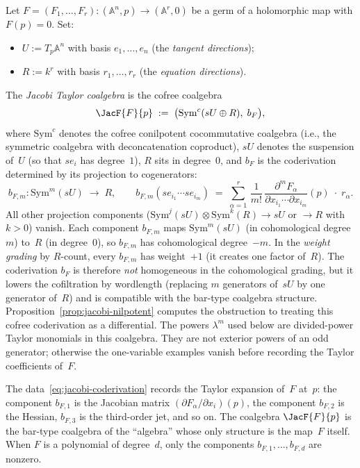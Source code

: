 \begin{construction}
\label{constr:jacobi-coalgebra}
Let $F = (F_1, \ldots, F_r) \colon (\mathbb{A}^n, p) \to (\mathbb{A}^r, 0)$ be a
germ of a holomorphic map with $F(p) = 0$. Set:
\begin{itemize}
\item $U := T_p\mathbb{A}^n$ with basis $e_1, \ldots, e_n$
 (the \emph{tangent directions});
\item $R := k^r$ with basis $r_1, \ldots, r_r$
 (the \emph{equation directions}).
\end{itemize}
The \emph{Jacobi Taylor coalgebra} is the cofree coalgebra
\[
\JacF{F}{p} \;:=\; \bigl(\mathrm{Sym}^c(sU \oplus R),\; b_F\bigr),
\]
where $\mathrm{Sym}^c$ denotes the cofree conilpotent cocommutative coalgebra
(i.e., the symmetric coalgebra with deconcatenation coproduct), $sU$
denotes the suspension of~$U$ (so that $se_i$ has degree~$1$), $R$
sits in degree~$0$, and $b_F$ is the coderivation determined by its
projection to cogenerators:
\begin{equation}\label{eq:jacobi-coderivation}
b_{F,m} \colon \mathrm{Sym}^m(sU) \;\longrightarrow\; R, \qquad
b_{F,m}(se_{i_1} \cdots se_{i_m})
\;=\; \sum_{\alpha=1}^{r}\,
\frac{1}{m!}\,
\frac{\partial^m F_\alpha}{\partial x_{i_1} \cdots \partial x_{i_m}}(p)
\;\cdot\; r_\alpha.
\end{equation}
All other projection components ($\mathrm{Sym}^j(sU) \otimes \mathrm{Sym}^k(R) \to sU$
or $\to R$ with $k > 0$) vanish. Each component $b_{F,m}$ maps
$\mathrm{Sym}^m(sU)$ (in cohomological degree~$m$) to~$R$ (in
degree~$0$), so $b_{F,m}$ has cohomological degree~$-m$. In the
\emph{weight grading} by $R$-count, every $b_{F,m}$ has weight~$+1$
(it creates one factor of~$R$). The coderivation $b_F$ is therefore
\emph{not} homogeneous in the cohomological grading, but it
lowers the cofiltration by wordlength (replacing $m$ generators
of~$sU$ by one generator of~$R$) and is compatible with the bar-type
coalgebra structure. Proposition~\ref{prop:jacobi-nilpotent} computes
the obstruction to treating this cofree coderivation as a differential.
The powers \(\lambda^m\) used below are divided-power Taylor
monomials in this coalgebra. They are not exterior powers of an odd
generator; otherwise the one-variable examples vanish before
recording the Taylor coefficients of~\(F\).
\end{construction}

\begin{remark}[Interpretation]
\label{rem:jacobi-interpretation}
The data~\eqref{eq:jacobi-coderivation} records the Taylor expansion
of~$F$ at~$p$: the component $b_{F,1}$ is the Jacobian matrix
$(\partial F_\alpha / \partial x_i)(p)$, the component $b_{F,2}$ is the
Hessian, $b_{F,3}$ is the third-order jet, and so on. The coalgebra
$\JacF{F}{p}$ is the bar-type coalgebra of the ``algebra'' whose only
structure is the map~$F$ itself. When $F$ is a polynomial of degree~$d$,
only the components $b_{F,1}, \ldots, b_{F,d}$ are nonzero.
\end{remark}

